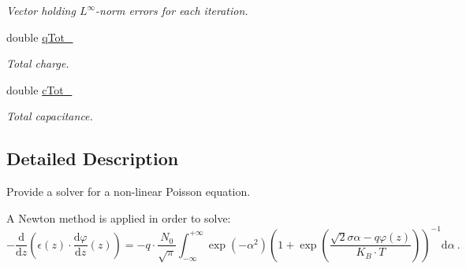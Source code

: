 \begin{DoxyCompactItemize}
\begin{DoxyCompactList}\small\item\em Vector holding $ L^\infty $-\/norm errors for each iteration. \end{DoxyCompactList}\item 
\hypertarget{classNonLinearPoisson1D_ae1963262f050f62954c9966d12b4f1b5}{double \hyperlink{classNonLinearPoisson1D_ae1963262f050f62954c9966d12b4f1b5}{q\-Tot\-\_\-}}\label{classNonLinearPoisson1D_ae1963262f050f62954c9966d12b4f1b5}

\begin{DoxyCompactList}\small\item\em Total charge. \end{DoxyCompactList}\item 
\hypertarget{classNonLinearPoisson1D_a15f65780cee04f1053be486efbdc3270}{double \hyperlink{classNonLinearPoisson1D_a15f65780cee04f1053be486efbdc3270}{c\-Tot\-\_\-}}\label{classNonLinearPoisson1D_a15f65780cee04f1053be486efbdc3270}

\begin{DoxyCompactList}\small\item\em Total capacitance. \end{DoxyCompactList}\end{DoxyCompactItemize}


\subsection{Detailed Description}
Provide a solver for a non-\/linear Poisson equation. 

A Newton method is applied in order to solve\-: \[ -\frac{\mathrm{d}}{\mathrm{d}z} \left(\epsilon(z) \cdot \frac{\mathrm{d}\varphi}{\mathrm{d}z}(z) \right) = - q \cdot \frac{N_0}{\sqrt{\pi}} \int_{-\infty}^{+\infty} \exp\left(-\alpha^2\right) \left( 1 + \exp\left( \frac{\sqrt{2}\sigma\alpha - q\varphi(z)}{K_B \cdot T} \right) \right)^{-1} \mathrm{d}\alpha ~ . \] 

